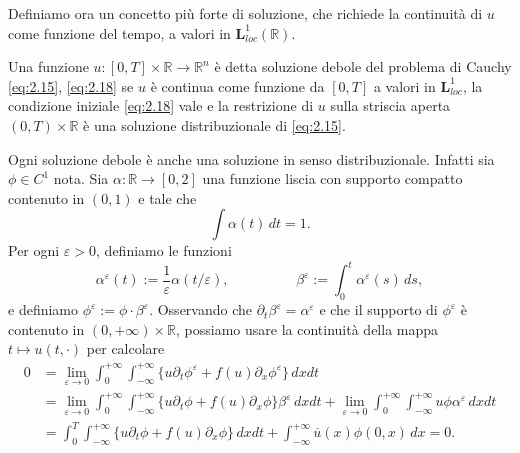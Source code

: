 Definiamo ora un concetto più forte di soluzione, che richiede la continuità di $u$ come funzione del tempo, a valori in $\mathbf{L}^{1}_{loc}(\mathbb{R})$.

\begin{definizione}
    Una funzione $u\colon [0,T]\times\mathbb{R}\rightarrow\mathbb{R}^{n}$ è detta soluzione debole del problema di Cauchy \eqref{eq:2.15}, \eqref{eq:2.18} se $u$ è continua come funzione da $[0,T]$ a valori in $\mathbf{L}^{1}_{loc}$, la condizione iniziale \eqref{eq:2.18} vale e la restrizione di $u$ sulla striscia aperta $(0,T)\times\mathbb{R}$ è una soluzione distribuzionale di \eqref{eq:2.15}.
\end{definizione}

\begin{osservazione}
    Ogni soluzione debole è anche una soluzione in senso distribuzionale. Infatti sia $\phi\in C^{1}$ nota. Sia $\alpha\colon\mathbb{R}\rightarrow [0,2]$ una funzione liscia con supporto compatto contenuto in $(0,1)$ e tale che 
    \begin{equation*}
        \int\alpha(t)\,dt = 1.
    \end{equation*}
    Per ogni $\varepsilon >0$, definiamo le funzioni
    \begin{equation*}
        \alpha^{\varepsilon}(t) := \frac{1}{\varepsilon}\alpha(t/\varepsilon), \hspace{2cm} \beta^{\varepsilon}:=\int_{0}^{t}\alpha^{\varepsilon}(s)\,ds,
    \end{equation*}
    e definiamo $\phi^{\varepsilon}:=\phi\cdot\beta^{\varepsilon}$. Osservando che $\partial_{t}\beta^{\varepsilon}=\alpha^{\varepsilon}$ e che il supporto di $\phi^{\varepsilon}$ è contenuto in $(0,+\infty)\times\mathbb{R}$, possiamo usare la continuità della mappa $t\mapsto u(t,\cdot)$ per calcolare
    \begin{align*}
        0 &= \lim_{\varepsilon\rightarrow 0}\int_{0}^{+\infty}\int_{-\infty}^{+\infty}\{u\partial_{t}\phi^{\varepsilon}+f(u)\partial_{x}\phi^{\varepsilon}\}\,dx dt \\
        &= \lim_{\varepsilon\rightarrow 0}\int_{0}^{+\infty}\int_{-\infty}^{+\infty}\{u\partial_{t}\phi+f(u)\partial_{x}\phi\}\beta^{\varepsilon} \,dx dt + \lim_{\varepsilon\rightarrow 0}\int_{0}^{+\infty}\int_{-\infty}^{+\infty} u\phi\alpha^{\varepsilon}\, dx dt \\
        &= \int_{0}^{T}\int_{-\infty}^{+\infty}\{u\partial_{t}\phi+f(u)\partial_{x}\phi\}\, dx dt + \int_{-\infty}^{+\infty}\overline{u}(x)\phi(0,x)\, dx = 0.

\end{align*}
\end{osservazione}
